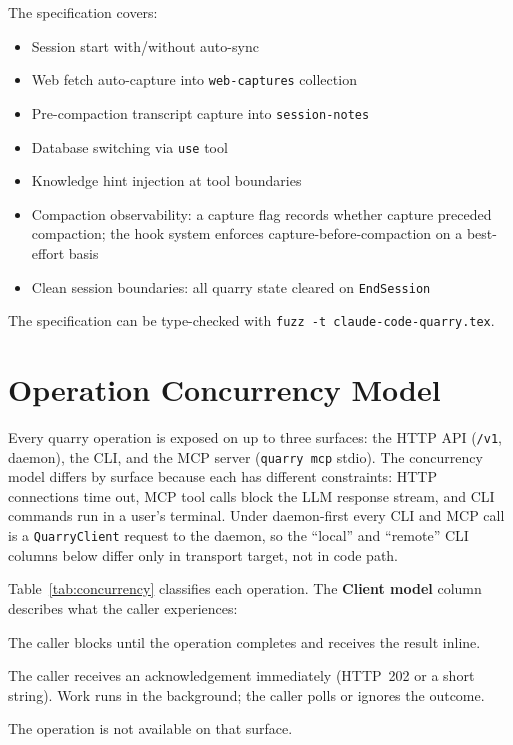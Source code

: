 \documentclass[a4paper,10pt]{article}
\begin{document}
The specification covers:

\begin{itemize}
  \item Session start with/without auto-sync
  \item Web fetch auto-capture into \texttt{web-captures} collection
  \item Pre-compaction transcript capture into \texttt{session-notes}
  \item Database switching via \texttt{use} tool
  \item Knowledge hint injection at tool boundaries
  \item Compaction observability: a capture flag records whether
    capture preceded compaction; the hook system enforces
    capture-before-compaction on a best-effort basis
  \item Clean session boundaries: all quarry state cleared on
    \texttt{EndSession}
\end{itemize}

The specification can be type-checked with \texttt{fuzz -t
claude-code-quarry.tex}.

\appendix

\section{Operation Concurrency Model}
\label{app:concurrency}

Every quarry operation is exposed on up to three surfaces: the HTTP
API (\texttt{/v1}, daemon), the CLI, and the MCP server (\texttt{quarry
mcp} stdio).  The concurrency model differs by surface because each has
different constraints: HTTP connections time out, MCP tool calls block
the LLM response stream, and CLI commands run in a user's terminal.
Under daemon-first every CLI and MCP call is a \texttt{QuarryClient}
request to the daemon, so the ``local'' and ``remote'' CLI columns below
differ only in transport target, not in code path.

Table~\ref{tab:concurrency} classifies each operation.  The
\textbf{Client model} column describes what the caller experiences:

\begin{description}[style=nextline,leftmargin=2.5cm]
  \item[sync] The caller blocks until the operation completes and
    receives the result inline.
  \item[fire-and-forget] The caller receives an acknowledgement
    immediately (HTTP~202 or a short string).  Work runs in the
    background; the caller polls or ignores the outcome.
  \item[---] The operation is not available on that surface.
\end{description}
\end{document}
